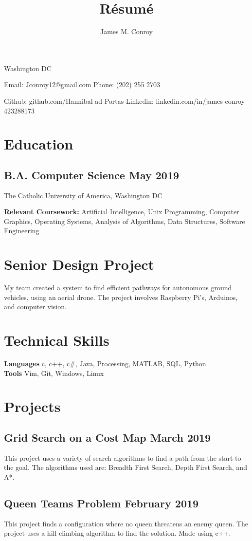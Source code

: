 \documentclass{article}
\author{James M. Conroy}
\title{R\'esum\'e}
\makeatletter
\renewcommand{\maketitle} {
	\begin{center}
	{\huge\bfseries
	\theauthor}

	Washington DC
	\end{center}


	Email: Jconroy12@gmail.com
	\hfill Phone: (202) 255 2703

	Github: github.com/Hannibal-ad-Portas
	\hfill Linkedin: linkedin.com/in/james-conroy-423288173
}
\makeatother
\begin{document}
\maketitle
\section{Education}
\subsection{B.A. Computer Science \hfill  May 2019}
The Catholic University of America, Washington DC

\textbf {Relevant Coursework:}
Artificial Intelligence,
Unix Programming,
Computer Graphics,
Operating Systems,
Analysis of Algorithms,
Data Structures,
Software Engineering
\section{Senior Design Project}
My team created a system to find efficient pathways for autonomous ground vehicles, using an aerial drone.
The project involves Raspberry Pi's, Arduinos, and computer vision.
\section{Technical Skills}

\textbf{Languages}
c,
c++,
c\#,
Java,
Processing,
MATLAB,
SQL,
Python \\
\textbf{Tools}
Vim,
Git,
Windows,
Linux

\section{Projects}

\subsection{Grid Search on a Cost Map \hfill March 2019}
This project uses a variety of search algorithms to find a path from the start to the goal.
The algorithms used are:
Breadth First Search,
Depth First Search,
and
A*.
\subsection{Queen Teams Problem \hfill February 2019}
This project finds a configuration where no queen threatens an enemy queen.
The project uses a hill climbing algorithm to find the solution.
Made using c++.
\end{document}
